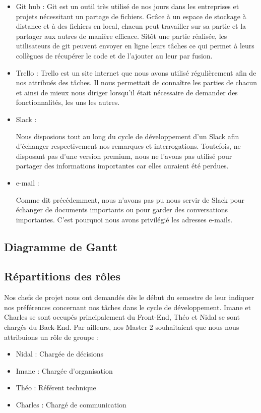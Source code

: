 \begin{itemize}
\item Git hub : 
Git est un outil très utilisé de nos jours dans les entreprises et projets nécessitant un partage de fichiers. Grâce à un espace de stockage à distance et à des fichiers en local, chacun peut travailler sur sa partie et la partager aux autres de manière efficace. Sitôt une partie réalisée, les utilisateurs de git peuvent envoyer en ligne leurs tâches ce qui permet à leurs collègues de récupérer le code et de l'ajouter au leur par fusion.

\item Trello :
Trello est un site internet que nous avons utilisé régulièrement afin de nos attribués des tâches. Il nous permettait de connaître les parties de chacun et ainsi de mieux nous diriger lorsqu'il était nécessaire de demander des fonctionnalités, les uns les autres.

\item Slack :

Nous disposions tout au long du cycle de développement d'un Slack afin d'échanger respectivement nos remarques et interrogations. Toutefois, ne disposant pas d'une version premium, nous ne l'avons pas utilisé pour partager des informations importantes car elles auraient été perdues.

\item e-mail :

Comme dit précédemment, nous n'avons pas pu nous servir de Slack pour échanger de documents importants ou pour garder des conversations importantes. C'est pourquoi nous avons privilégié les adresses e-mails.

\end{itemize}


\subsection{Diagramme de Gantt}


\subsection{Répartitions des rôles}

Nos chefs de projet nous ont demandés dès le début du semestre de leur indiquer nos préférences concernant nos tâches dans le cycle de développement. Imane et Charles se sont occupés principalement du Front-End, Théo et Nidal se sont chargés du Back-End.
Par ailleurs, nos Master 2 souhaitaient que nous nous attribuions un rôle de groupe : 

\begin{itemize}
\item Nidal : Chargée de décisions
\item Imane : Chargée d'organisation
\item Théo : Référent technique
\item Charles : Chargé de communication
\end{itemize}